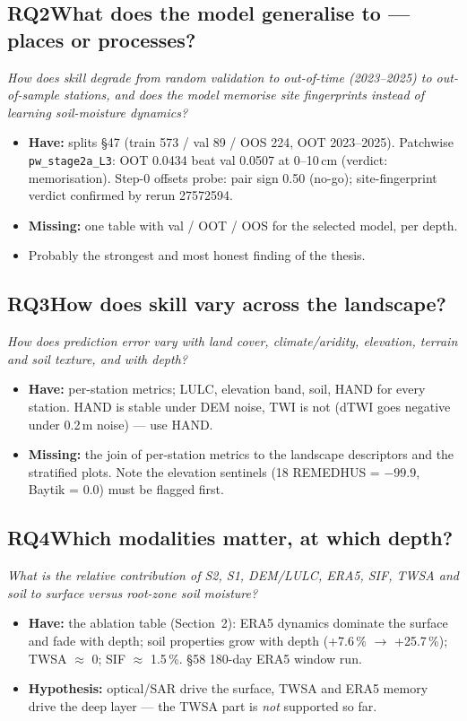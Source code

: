 \documentclass[11pt,a4paper]{article}
\newcommand{\rqhead}[2]{\subsection*{#1\quad #2}}
\begin{document}
\rqhead{RQ2}{What does the model generalise to --- places or processes?}
\textit{How does skill degrade from random validation to out-of-time (2023--2025) to out-of-sample
stations, and does the model memorise site fingerprints instead of learning soil-moisture dynamics?}
\begin{itemize}
\item \textbf{Have:} splits \S47 (train 573 / val 89 / OOS 224, OOT 2023--2025). Patchwise
      \texttt{pw\_stage2a\_L3}: OOT 0.0434 beat val 0.0507 at 0--10\,cm (verdict: memorisation).
      Step-0 offsets probe: pair sign 0.50 (no-go); site-fingerprint verdict confirmed by rerun 27572594.
\item \textbf{Missing:} one table with val / OOT / OOS for the selected model, per depth.
\item Probably the strongest and most honest finding of the thesis.
\end{itemize}

\rqhead{RQ3}{How does skill vary across the landscape?}
\textit{How does prediction error vary with land cover, climate/aridity, elevation, terrain and
soil texture, and with depth?}
\begin{itemize}
\item \textbf{Have:} per-station metrics; LULC, elevation band, soil, HAND for every station.
      HAND is stable under DEM noise, TWI is not (dTWI goes negative under 0.2\,m noise) --- use HAND.
\item \textbf{Missing:} the join of per-station metrics to the landscape descriptors and the stratified plots.
      Note the elevation sentinels (18 REMEDHUS = $-99.9$, Baytik = 0.0) must be flagged first.
\end{itemize}

\rqhead{RQ4}{Which modalities matter, at which depth?}
\textit{What is the relative contribution of S2, S1, DEM/LULC, ERA5, SIF, TWSA and soil to
surface versus root-zone soil moisture?}
\begin{itemize}
\item \textbf{Have:} the ablation table (Section~2): ERA5 dynamics dominate the surface and fade
      with depth; soil properties grow with depth (+7.6\,\% $\rightarrow$ +25.7\,\%); TWSA $\approx$ 0;
      SIF $\approx$ 1.5\,\%. \S58 180-day ERA5 window run.
\item \textbf{Hypothesis:} optical/SAR drive the surface, TWSA and ERA5 memory drive the deep layer
      --- the TWSA part is \emph{not} supported so far.
\end{itemize}
\end{document}
